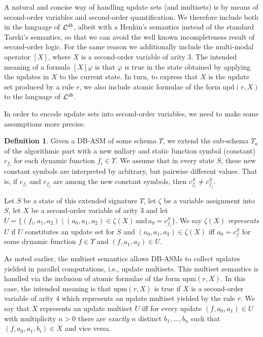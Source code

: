 \documentclass[preprint,11pt]{elsarticle}
\theoremstyle{definition}
\newtheorem{definition}{Definition}[section]
\theoremstyle{remark}
\begin{document}
 A natural and concise way of handling update sets (and multisets) is by means of second-order variables and second-order quantification. We therefore include both in the language of ${\cal L}^{db}$, albeit with a Henkin's semantics instead of the standard Tarski's semantics, so that we can avoid the well known incompleteness result of second-order logic.  
For the same reason we additionally include the multi-modal operator $[X]$, where $X$ is a second-order variable of arity $3$. The intended meaning of a formula $[X]\varphi$ is that $\varphi$ is true in the state obtained by applying the updates in $X$ to the current state. In turn, to express that $X$ is the update set produced by a rule $r$, we also include atomic formulae of the form $\textrm{upd}(r, X)$ to the language of ${\cal L}^{db}$.  

In order to encode update sets into second-order variables, we need to make some assumptions more precise.

\begin{definition}\label{extendedState}
Given a DB-ASM of some schema $\Upsilon$, we extend the sub-schema $\Upsilon_a$ of the algorithmic part with a new nullary and static function symbol (constant) $c_{f_i}$ for each dynamic function $f_i \in \Upsilon$. We assume that in every state $S$, these new constant symbols are interpreted by arbitrary, but pairwise different values. That is, if $c_{f_i}$ and $c_{f_j}$ are among the new constant symbols, then $c^S_{f_i} \neq c^S_{f_j}$.    

\smallskip

Let $S$ be a state of this extended signature $\Upsilon$, let $\zeta$ be a variable assignment into $S$, let $X$ be a second-order variable of arity $3$ and let $U = \{(f_i, a_1, a_2) \mid (a_0, a_1, a_2) \in \zeta(X) \, \text{and} \, a_0 = c_{f_i}^S\}$. We say $\zeta(X)$ \emph{represents} $U$ if $U$ constitutes an update set for $S$ and $(a_0, a_1, a_2) \in \zeta(X)$ iff $a_0 = c^S_f$ for some dynamic function $f \in \Upsilon$ and $(f, a_1, a_2) \in U$. 
\end{definition}


As noted earlier, the multiset semantics allows DB-ASMs to collect updates yielded in parallel computations, i.e., update multisets. This multiset semantics is handled via the inclusion of atomic formulae of the form $\mathrm{upm}(r,X)$. In this case, the intended meaning is that $\mathrm{upm}(r,X)$ is true if $X$ is a second-order variable of arity $4$ which represents an update multiset yielded by the rule $r$. We say that $X$ represents an update multiset $\ddot{U}$ iff for every update $(f, a_0, a_1) \in \ddot{U}$ with multiplicity $n > 0$ there are \emph{exactly} $n$ distinct $b_1, \ldots, b_n$ such that $(f,a_0,a_1,b_i) \in X$ and vice versa. 
\end{document}
